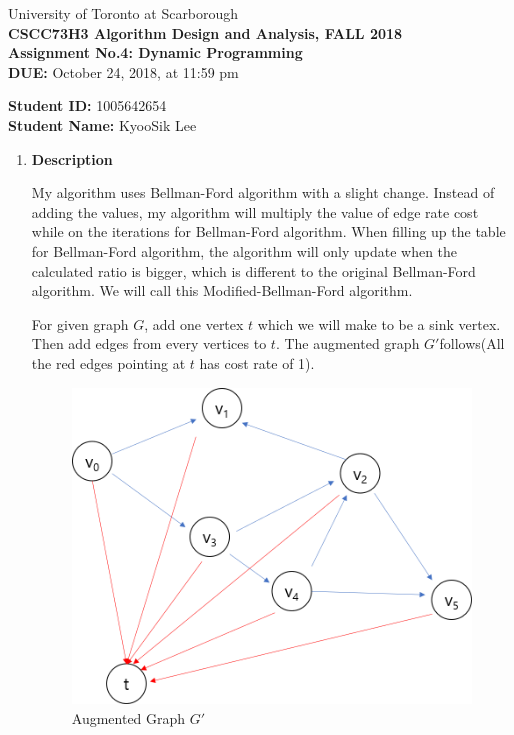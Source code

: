 \documentclass[a4paper,11pt]{article}
\begin{document}
\begin{center}
University of Toronto at Scarborough\\[0.1in]
{\bf CSCC73H3 Algorithm Design and Analysis, FALL 2018} \\[0.1in]
{\large{\bf Assignment No.4: Dynamic Programming}}\\[0.1in]
{\bf DUE:} October 24, 2018, at 11:59 pm
\end{center}


\vspace{0.1in}
\noindent
{\bf Student ID:} 1005642654 \\[0.15in]
{\bf Student Name:} KyooSik Lee
\vspace{0.3in}

\vspace{0.3in}
\begin{enumerate}

\item {\bf Description}

My algorithm uses Bellman-Ford algorithm with a slight change. Instead of adding the values, my algorithm will multiply the value of edge rate cost while on the iterations for Bellman-Ford algorithm. When filling up the table for Bellman-Ford algorithm, the algorithm will only update when the calculated ratio is bigger, which is different to the original Bellman-Ford algorithm. We will call this Modified-Bellman-Ford algorithm.

For given graph $G$, add one vertex $t$ which we will make to be a sink vertex. Then add edges from every vertices to $t$. The augmented graph $G'$follows(All the red edges pointing at $t$ has cost rate of 1).


\begin{figure}[hbt]
	\centering
	\includegraphics[scale=0.5]{figure3.png}
	\caption{Augmented Graph $G'$}
\end{figure}


\end{enumerate}
\end{document}
